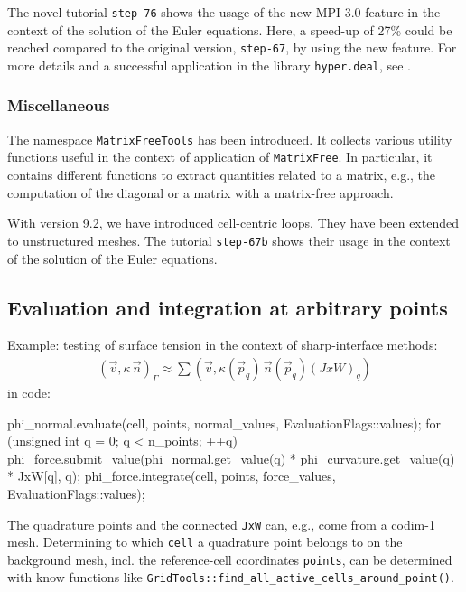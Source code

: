 \documentclass{ansarticle-preprint}
\begin{document}
The novel tutorial \texttt{step-76} shows the usage of the new MPI-3.0 feature
 in the context of the solution
of the Euler equations. Here, a speed-up of 27\% could be reached compared to the
original version, \texttt{step-67}, by using the new feature.
For more details and a successful application in the library \texttt{hyper.deal}, see \citep{munch2020hyperdeal}.

\subsubsection{Miscellaneous}

The namespace \texttt{MatrixFreeTools} has been introduced. It collects various utility
functions useful in the context of application of \texttt{MatrixFree}. In particular,
it contains different functions to extract quantities related to a matrix, e.g., the
computation of the diagonal or a matrix with a matrix-free approach.

With version 9.2, we have introduced cell-centric loops. They have been extended to unstructured
meshes. The tutorial \texttt{step-67b} shows their usage in the context of the solution
of the Euler equations.



\subsection{Evaluation and integration at arbitrary points}
\label{subsec:fepointvalues}

Example: testing of surface tension in the context of sharp-interface methods:
\begin{align*}
\left(\vec{v}, \kappa \, \vec{n}\right)_\Gamma
\approx
\sum\left(\vec{v}, \kappa(\vec{p}_q) \, \vec{n}(\vec{p}_q) (JxW)_q\right)
\end{align*}
in code:
\begin{c++}
phi_normal.evaluate(cell, points, normal_values, EvaluationFlags::values);
for (unsigned int q = 0; q < n_points; ++q)
   phi_force.submit_value(phi_normal.get_value(q) *
                          phi_curvature.get_value(q) * JxW[q], q);
phi_force.integrate(cell, points, force_values, EvaluationFlags::values);
\end{c++}
The quadrature points and the connected \texttt{JxW} can, e.g., come from a
codim-1 mesh. Determining to which \texttt{cell} a quadrature point belongs
to on the background mesh, incl. the reference-cell coordinates \texttt{points},
can be determined with know functions like \texttt{GridTools::find\_all\_active\_cells\_around\_point()}.
\end{document}
